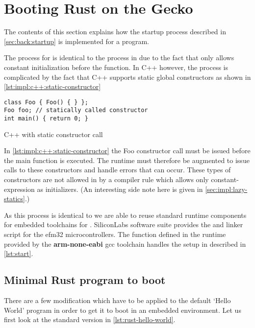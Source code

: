 \section{Booting Rust on the Gecko}
\label{sec:impl:booting}

The contents of this section explains how the startup process described in \autoref{sec:back:startup} is implemented for a {\rust} program.

The process for {\rust} is identical to the process in {\C} due to the fact that {\rust} only allows constant initialization before the {\main} function.
In C++ however, the process is complicated by the fact that C++ supports static global constructors as shown in \autoref{lst:impl:c++:static-constructor}

\begin{listing}[H]
  \begin{verbatim}
class Foo { Foo() { } };
Foo foo; // statically called constructor
int main() { return 0; }
  \end{verbatim}
  \caption{C++ with static constructor call}
  \label{lst:impl:c++:static-constructor}
\end{listing}

In \autoref{lst:impl:c++:static-constructor} the Foo constructor call must be issued before the main function is executed.
The runtime must therefore be augmented to issue calls to these constructors and handle errors that can occur.
These types of constructors are not allowed in {\rust} by a compiler rule which allows only constant-expression as initializers.
(An interesting side note here is given in \autoref{sec:impl:lazy-statics}.)

As this process is identical to {\C} we are able to reuse standard runtime components for embedded toolchains for {\C}.
SiliconLabs software suite provides the  and linker script for the efm32 microcontrollers.
The  function defined in the {\C} runtime provided by the \textbf{arm-none-eabi} gcc toolchain handles the setup in  described in \autoref{lst:start}.

\subsection{Minimal Rust program to boot}

There are a few modification which have to be applied to the default `Hello World' program in order to get it to boot in an embedded environment.
Let us first look at the standard version in \autoref{lst:rust-hello-world}.

